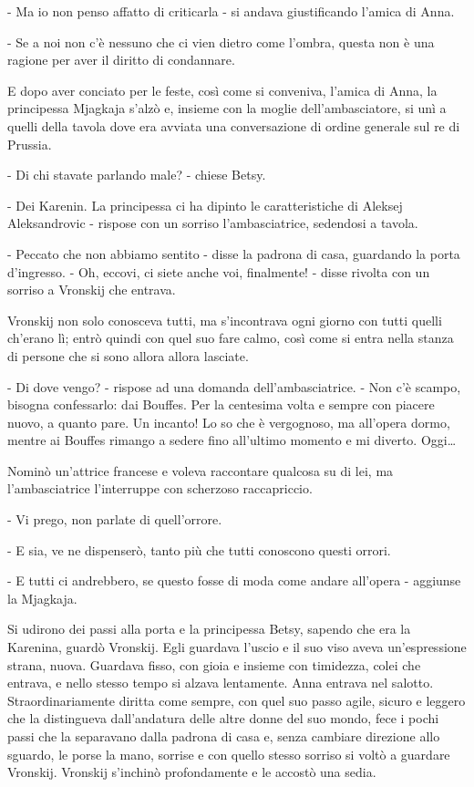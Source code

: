 - Ma io non penso affatto di criticarla - si andava giustificando l'amica di Anna. 

- Se a noi non c'è nessuno che ci vien dietro come l'ombra, questa non è una ragione per aver il diritto di condannare. 

E dopo aver conciato per le feste, così come si conveniva, l'amica di Anna, la principessa Mjagkaja s'alzò e, insieme con la moglie dell'ambasciatore, si unì a quelli della tavola dove era avviata una conversazione di ordine generale sul re di Prussia. 

- Di chi stavate parlando male? - chiese Betsy. 

- Dei Karenin. La principessa ci ha dipinto le caratteristiche di Aleksej Aleksandrovic - rispose con un sorriso l'ambasciatrice, sedendosi a tavola. 

- Peccato che non abbiamo sentito - disse la padrona di casa, guardando la porta d'ingresso. - Oh, eccovi, ci siete anche voi, finalmente! - disse rivolta con un sorriso a Vronskij che entrava. 

Vronskij non solo conosceva tutti, ma s'incontrava ogni giorno con tutti quelli ch'erano lì; entrò quindi con quel suo fare calmo, così come si entra nella stanza di persone che si sono allora allora lasciate. 

- Di dove vengo? - rispose ad una domanda dell'ambasciatrice. - Non c'è scampo, bisogna confessarlo: dai Bouffes. Per la centesima volta e sempre con piacere nuovo, a quanto pare. Un incanto! Lo so che è vergognoso, ma all'opera dormo, mentre ai Bouffes rimango a sedere fino all'ultimo momento e mi diverto. Oggi\ldots{} 

Nominò un'attrice francese e voleva raccontare qualcosa su di lei, ma l'ambasciatrice l'interruppe con scherzoso raccapriccio. 

- Vi prego, non parlate di quell'orrore. 

- E sia, ve ne dispenserò, tanto più che tutti conoscono questi orrori. 

- E tutti ci andrebbero, se questo fosse di moda come andare all'opera - aggiunse la Mjagkaja. 

\label{vii-1} 

Si udirono dei passi alla porta e la principessa Betsy, sapendo che era la Karenina, guardò Vronskij. Egli guardava l'uscio e il suo viso aveva un'espressione strana, nuova. Guardava fisso, con gioia e insieme con timidezza, colei che entrava, e nello stesso tempo si alzava lentamente. Anna entrava nel salotto. Straordinariamente diritta come sempre, con quel suo passo agile, sicuro e leggero che la distingueva dall'andatura delle altre donne del suo mondo, fece i pochi passi che la separavano dalla padrona di casa e, senza cambiare direzione allo sguardo, le porse la mano, sorrise e con quello stesso sorriso si voltò a guardare Vronskij. Vronskij s'inchinò profondamente e le accostò una sedia. 

